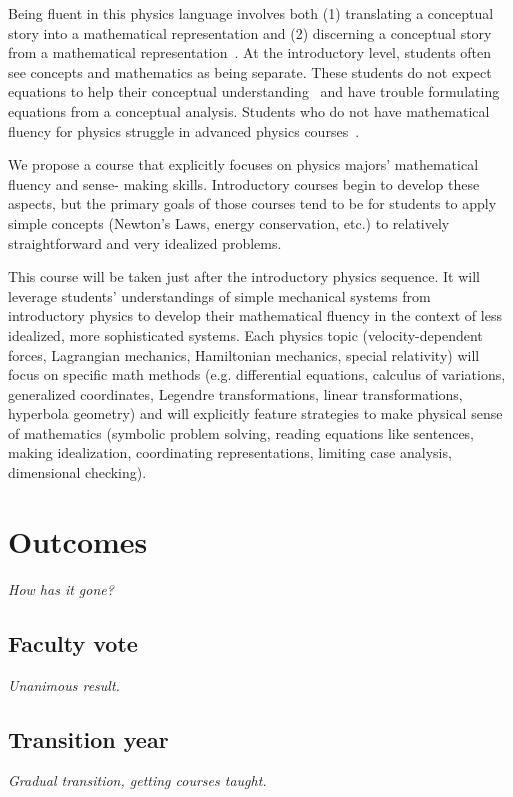 \documentclass[english,aps,pra,reprint,noshowpacs,superscriptaddress]{revtex4-1}
\begin{document}
Being fluent in this physics language involves both (1) translating a
conceptual story into a mathematical representation and (2) discerning
a conceptual story from a mathematical
representation~\cite{tuminaro2007elements}. At the introductory level,
students often see concepts and mathematics as being separate. These
students do not expect equations to help their conceptual
understanding~\cite{adams2006new, redish1998expectations} and have
trouble formulating equations from a conceptual analysis. Students who
do not have mathematical fluency for physics struggle in advanced
physics courses~\cite{manogue2009cognitive}.

We propose a course that explicitly focuses on physics majors'
mathematical fluency and sense- making skills. Introductory courses
begin to develop these aspects, but the primary goals of those courses
tend to be for students to apply simple concepts (Newton's Laws,
energy conservation, etc.)  to relatively straightforward and very
idealized problems.

This course will be taken just after the introductory physics
sequence. It will leverage students' understandings of simple
mechanical systems from introductory physics to develop their
mathematical fluency in the context of less idealized, more
sophisticated systems. Each physics topic (velocity-dependent forces,
Lagrangian mechanics, Hamiltonian mechanics, special relativity) will
focus on specific math methods (e.g. differential equations, calculus
of variations, generalized coordinates, Legendre transformations,
linear transformations, hyperbola geometry) and will explicitly
feature strategies to make physical sense of mathematics (symbolic
problem solving, reading equations like sentences, making
idealization, coordinating representations, limiting case analysis,
dimensional checking).

\section{Outcomes}
\emph{How has it gone?}

\subsection{Faculty vote}
\emph{Unanimous result.}
\subsection{Transition year}
\emph{Gradual transition, getting courses taught.}
\end{document}
